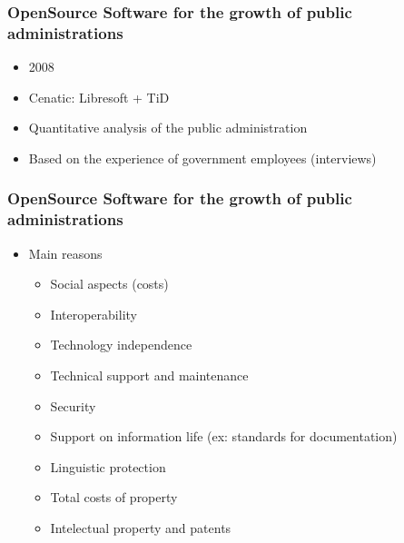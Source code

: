 \documentclass{beamer}
\begin{document}
\begin{frame}
\frametitle{ OpenSource Software for the growth of public administrations}

\begin{itemize}
\item 2008
\item Cenatic: Libresoft + TiD
\item Quantitative analysis of the public administration
\item Based on the experience of government employees (interviews) 
\end{itemize}

\end{frame}


\begin{frame}
\frametitle{ OpenSource Software for the growth of public administrations}

\begin{itemize}
\item Main reasons
\begin{itemize}
\item Social aspects  (costs)
\item Interoperability
\item Technology independence
\item Technical support and maintenance
\item Security
\item Support on information life (ex: standards for documentation)
\item Linguistic protection
\item Total costs of property
\item Intelectual property and patents

\end{itemize}
\end{itemize}

\end{frame}
\end{document}
